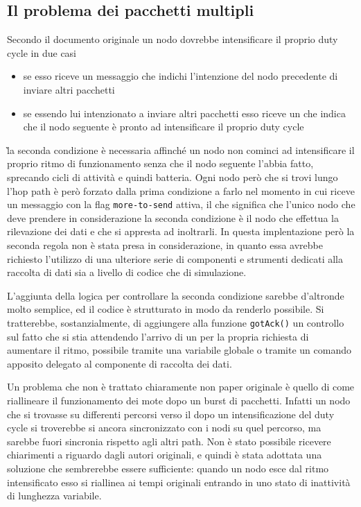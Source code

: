 \documentclass[twoside,11pt,a4paper,italian,openany]{book}
\begin{document}
\subsection{Il problema dei pacchetti multipli}
Secondo il documento originale un nodo dovrebbe intensificare il proprio duty cycle in due casi
\begin{itemize}
\item{se esso riceve un messaggio che indichi l'intenzione del nodo precedente di inviare altri 
pacchetti}
\item{se essendo lui intenzionato a inviare altri pacchetti esso riceve un \ack che indica che il nodo seguente è pronto ad intensificare il proprio duty cycle}
\end{itemize}
\`la seconda condizione è necessaria affinché un nodo non cominci ad intensificare il proprio 
ritmo di funzionamento senza che il nodo seguente l'abbia fatto, sprecando cicli di attività e 
quindi batteria. Ogni nodo però che si trovi lungo l'hop path è però forzato dalla prima 
condizione a farlo nel momento in cui riceve un messaggio con la flag \texttt{more-to-send} 
attiva, il che significa che l'unico nodo che deve prendere in considerazione la seconda 
condizione è il nodo che effettua la rilevazione dei dati e che si appresta ad inoltrarli. 
In questa implentazione però la seconda regola non è stata presa in considerazione, in quanto 
essa avrebbe richiesto l'utilizzo di una ulteriore serie di componenti e strumenti dedicati alla 
raccolta di dati sia a livello di codice che di simulazione.

L'aggiunta della logica per controllare la seconda condizione sarebbe d'altronde molto 
semplice, ed il codice è strutturato in modo da renderlo possibile.
Si tratterebbe, sostanzialmente, di aggiungere alla funzione \texttt{gotAck()} un controllo sul 
fatto che si stia attendendo l'arrivo di un \ack per la propria richiesta di aumentare il ritmo,
possibile tramite una variabile globale o tramite un comando apposito delegato al componente di 
raccolta dei dati.  

Un problema che non è trattato chiaramente non paper originale\cite{DMAC} è quello di come riallineare il funzionamento dei mote dopo un burst di pacchetti. 
Infatti un nodo che si trovasse su differenti percorsi verso il \sink dopo un intensificazione 
del duty cycle si troverebbe si ancora sincronizzato con i nodi su quel percorso, ma sarebbe 
fuori sincronia rispetto agli altri path. 
Non è stato possibile ricevere chiarimenti a riguardo dagli autori originali, e quindi è stata 
adottata una soluzione che sembrerebbe essere sufficiente: quando un nodo esce dal ritmo 
intensificato esso si riallinea ai tempi originali entrando in uno stato di inattività di 
lunghezza variabile.
 
\end{document}
